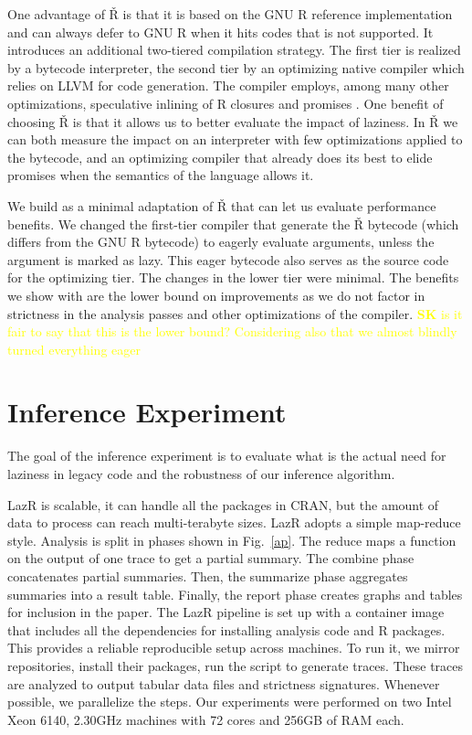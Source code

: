 \documentclass[review,creen,acmsmall]{acmart}
\newcommand{\authorcomment}[3]{\xspace\textcolor{#1}{{\bf #2} #3}\xspace}
\newcommand{\SK}[1]{\authorcomment{yellow}{SK}{#1}}
\newcommand{\lazr}{{\sf LazR}\xspace}
\renewcommand{\Rsh}{{\sf\v R}\xspace}
\begin{document}
One advantage of \Rsh is that it is based on the GNU R reference implementation
and can always defer to GNU R when it hits codes that is not supported. It
introduces an additional two-tiered compilation strategy. The first tier is
realized by a bytecode interpreter, the second tier by an optimizing native
compiler which relies on LLVM for code generation. The compiler employs, among
many other optimizations, speculative inlining of R closures and promises
\citep{dls19, oopsla20c}.
One benefit of choosing \Rsh is that it allows us to better evaluate the impact
of laziness. In \Rsh we can both measure the impact on an interpreter with few
optimizations applied to the bytecode, and an optimizing compiler that already
does its best to elide promises when the semantics of the language allows it.

We build \rshstrict as a minimal adaptation of \Rsh that can let us evaluate
performance benefits. We changed the first-tier compiler that generate the \Rsh
bytecode (which differs from the GNU R bytecode) to eagerly evaluate arguments,
unless the argument is marked as lazy. This eager bytecode also serves as the
source code for the optimizing tier.  The changes in the lower tier were minimal.
The benefits we show with \rshstrict are the lower bound on improvements as we
do not factor in strictness in the analysis passes and other optimizations of
the compiler. \SK{is it fair to say that this is the lower bound? Considering also
that we almost blindly turned everything eager}


\section{Inference Experiment}

The goal of the inference experiment is to evaluate what is the actual need for
laziness in legacy code and the robustness of our inference algorithm.

\lazr is scalable, it can handle all the packages in CRAN, but the amount of
data to process can reach multi-terabyte sizes. \lazr adopts a simple map-reduce
style. Analysis is split in phases shown in Fig.~\ref{ap}. The reduce maps a
function on the output of one trace to get a partial summary. The combine phase
concatenates partial summaries. Then, the summarize phase aggregates summaries
into a result table. Finally, the report phase creates graphs and tables for
inclusion in the paper. The \lazr pipeline is set up with a container image that
includes all the dependencies for installing analysis code and R packages. This
provides a reliable reproducible setup across machines. To run it, we mirror
repositories, install their packages, run the script to generate traces. These
traces are analyzed to output tabular data files and strictness signatures.
Whenever possible, we parallelize the steps. Our experiments were performed on
two Intel Xeon 6140, 2.30GHz machines with 72 cores and 256GB of RAM each.
\end{document}
